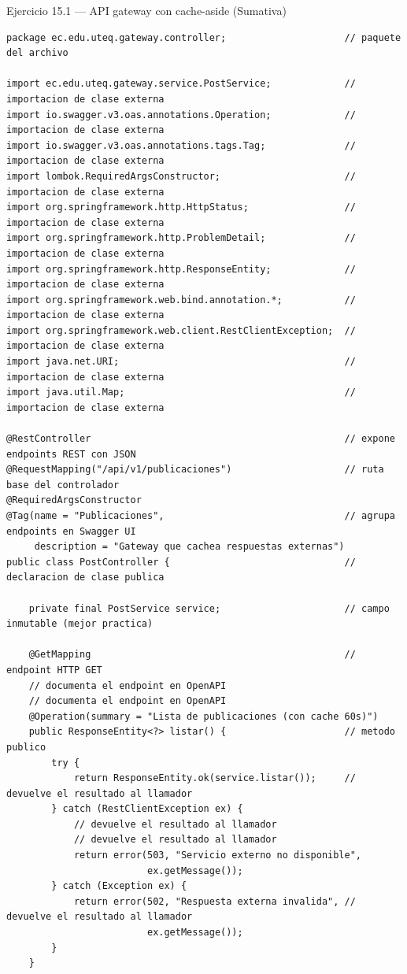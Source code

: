 \documentclass[11pt,a4paper,openany]{book}
\begin{document}
\begin{cajaejercicio}{Ejercicio 15.1 --- API gateway con cache-aside (Sumativa)}
\begin{lstlisting}[style=java,caption={PostController.java},label=lst:15.19]
package ec.edu.uteq.gateway.controller;                     // paquete del archivo

import ec.edu.uteq.gateway.service.PostService;             // importacion de clase externa
import io.swagger.v3.oas.annotations.Operation;             // importacion de clase externa
import io.swagger.v3.oas.annotations.tags.Tag;              // importacion de clase externa
import lombok.RequiredArgsConstructor;                      // importacion de clase externa
import org.springframework.http.HttpStatus;                 // importacion de clase externa
import org.springframework.http.ProblemDetail;              // importacion de clase externa
import org.springframework.http.ResponseEntity;             // importacion de clase externa
import org.springframework.web.bind.annotation.*;           // importacion de clase externa
import org.springframework.web.client.RestClientException;  // importacion de clase externa
import java.net.URI;                                        // importacion de clase externa
import java.util.Map;                                       // importacion de clase externa

@RestController                                             // expone endpoints REST con JSON
@RequestMapping("/api/v1/publicaciones")                    // ruta base del controlador
@RequiredArgsConstructor
@Tag(name = "Publicaciones",                                // agrupa endpoints en Swagger UI
     description = "Gateway que cachea respuestas externas")
public class PostController {                               // declaracion de clase publica

    private final PostService service;                      // campo inmutable (mejor practica)

    @GetMapping                                             // endpoint HTTP GET
    // documenta el endpoint en OpenAPI
    // documenta el endpoint en OpenAPI
    @Operation(summary = "Lista de publicaciones (con cache 60s)")
    public ResponseEntity<?> listar() {                     // metodo publico
        try {
            return ResponseEntity.ok(service.listar());     // devuelve el resultado al llamador
        } catch (RestClientException ex) {
            // devuelve el resultado al llamador
            // devuelve el resultado al llamador
            return error(503, "Servicio externo no disponible",
                         ex.getMessage());
        } catch (Exception ex) {
            return error(502, "Respuesta externa invalida", // devuelve el resultado al llamador
                         ex.getMessage());
        }
    }


\end{lstlisting}
\end{cajaejercicio}
\end{document}
